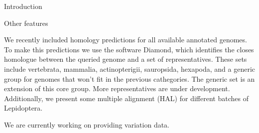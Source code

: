 \documentclass[final]{beamer}
\newlength{\colwidth}
\begin{document}
\begin{frame}[t]
\begin{columns}[t]
\begin{column}{\colwidth}
\begin{block}{Introduction}
\end{block}

\begin{block}{Other features}

We recently included homology predictions for all available annotated genomes.
To make this predictions we use the software Diamond, which identifies the closes homologue between the queried genome and a set of representatives.
These sets include vertebrata, mammalia, actinopterigii, sauropsida, hexapoda, and a generic group for genomes that won't fit in the previous cathegories.
The generic set is an extension of this core group.
More representatives are under development.
Additionally, we present some multiple alignment (HAL) for different batches of Lepidoptera.

We are currently working on providing variation data.

\end{block}



\end{column}
\end{columns}
\end{frame}
\end{document}
